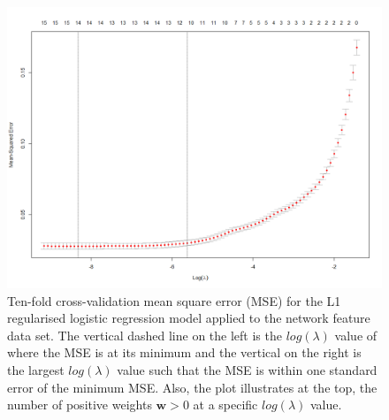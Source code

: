 \begin{figure}
	\begin{center}
		\includegraphics[scale=0.45]{fig/CH3/cv_lambda_network.png}
		\caption{Ten-fold cross-validation mean square error (MSE) for the L1 regularised logistic regression model applied to the network feature data set. The vertical dashed line on the left is the $log(\lambda)$ value of where the MSE is at its minimum and the vertical on the right is the largest $log(\lambda)$ value such that the MSE is within one standard error of the minimum MSE. Also, the plot illustrates at the top, the number of positive weights $\boldsymbol{w} > 0$ at a specific $log(\lambda)$ value.}
		\label{fig:ch3_lr_lambda_cv_network}
	\end{center}	
\end{figure}

